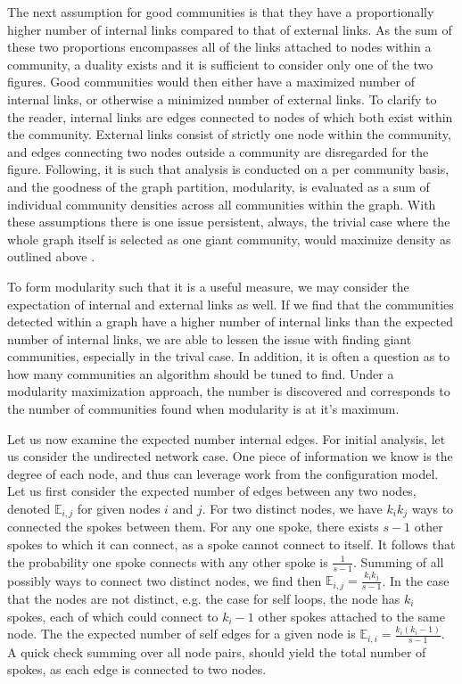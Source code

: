 \documentclass[a4paper, 10pt, twocolumn]{article}
\begin{document}
The next assumption for good communities is that they have a proportionally higher number of internal links compared to that of external links. 
As the sum of these two proportions encompasses all of the links attached to nodes within a community, a duality exists and it is sufficient to consider only one of the two figures. 
Good communities would then either have a maximized number of internal links, or otherwise a minimized number of external links. 
To clarify to the reader, internal links are edges connected to nodes of which both exist within the community. 
External links consist of strictly one node within the community, and edges connecting two nodes outside a community are disregarded for the figure. 
Following, it is such that analysis is conducted on a per community basis, and the goodness of the graph partition, modularity, is evaluated as a sum of individual community densities across all communities within the graph. 
With these assumptions there is one issue persistent, always, the trivial case where the whole graph itself is selected as one giant community, would maximize density as outlined above \cite{finding_comm_struct}. 

To form modularity such that it is a useful measure, we may consider the expectation of internal and external links as well. 
If we find that the communities detected within a graph have a higher number of internal links than the expected number of internal links, we are able to lessen the issue with finding giant communities, especially in the trival case. 
In addition, it is often a question as to how many communities an algorithm should be tuned to find.
Under a modularity maximization approach, the number is discovered and corresponds to the number of communities found when modularity is at it's maximum. 

Let us now examine the expected number internal edges. 
For initial analysis, let us consider the undirected network case. 
One piece of information we know is the degree of each node, and thus can leverage work from the configuration model. 
Let us first consider the expected number of edges between any two nodes, denoted $ \mathbb{E}_{i, j} $ for given nodes $ i $ and $ j $. 
For two distinct nodes, we have $ k_{i} k_{j} $ ways to connected the spokes between them. 
For any one spoke, there exists $ s - 1 $ other spokes to which it can connect, as a spoke cannot connect to itself. 
It follows that the probability one spoke connects with any other spoke is $ \frac{1}{s - 1} $.  
Summing of all possibly ways to connect two distinct nodes, we find then $ \mathbb{E}_{i, j} = \frac{k_{i} k_{j}}{s - 1} $. 
In the case that the nodes are not distinct, e.g. the case for self loops, the node has $ k_{i} $ spokes, each of which could connect to $ k_{i} - 1 $ other spokes attached to the same node. 
The the expected number of self edges for a given node is $ \mathbb{E}_{i, i} = \frac{k_{i} (k_{i} - 1)}{s - 1} $.
A quick check summing over all node pairs, should yield the total number of spokes, as each edge is connected to two nodes. 
\end{document}
